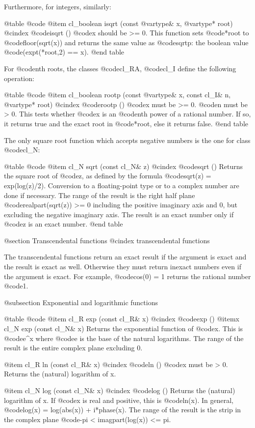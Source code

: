 Furthermore, for integers, similarly:

@table @code
@item cl_boolean isqrt (const @var{type}& x, @var{type}* root)
@cindex @code{isqrt ()}
@code{x} should be >= 0. This function sets @code{*root} to
@code{floor(sqrt(x))} and returns the same value as @code{sqrtp}:
the boolean value @code{(expt(*root,2) == x)}.
@end table

For @code{n}th roots, the classes @code{cl_RA}, @code{cl_I}
define the following operation:

@table @code
@item cl_boolean rootp (const @var{type}& x, const cl_I& n, @var{type}* root)
@cindex @code{rootp ()}
@code{x} must be >= 0. @code{n} must be > 0.
This tests whether @code{x} is an @code{n}th power of a rational number.
If so, it returns true and the exact root in @code{*root}, else it returns
false.
@end table

The only square root function which accepts negative numbers is the one
for class @code{cl_N}:

@table @code
@item cl_N sqrt (const cl_N& z)
@cindex @code{sqrt ()}
Returns the square root of @code{z}, as defined by the formula
@code{sqrt(z) = exp(log(z)/2)}. Conversion to a floating-point type
or to a complex number are done if necessary. The range of the result is the
right half plane @code{realpart(sqrt(z)) >= 0}
including the positive imaginary axis and 0, but excluding
the negative imaginary axis.
The result is an exact number only if @code{z} is an exact number.
@end table


@section Transcendental functions
@cindex transcendental functions

The transcendental functions return an exact result if the argument
is exact and the result is exact as well. Otherwise they must return
inexact numbers even if the argument is exact.
For example, @code{cos(0) = 1} returns the rational number @code{1}.


@subsection Exponential and logarithmic functions

@table @code
@item cl_R exp (const cl_R& x)
@cindex @code{exp ()}
@itemx cl_N exp (const cl_N& x)
Returns the exponential function of @code{x}. This is @code{e^x} where
@code{e} is the base of the natural logarithms. The range of the result
is the entire complex plane excluding 0.

@item cl_R ln (const cl_R& x)
@cindex @code{ln ()}
@code{x} must be > 0. Returns the (natural) logarithm of x.

@item cl_N log (const cl_N& x)
@cindex @code{log ()}
Returns the (natural) logarithm of x. If @code{x} is real and positive,
this is @code{ln(x)}. In general, @code{log(x) = log(abs(x)) + i*phase(x)}.
The range of the result is the strip in the complex plane
@code{-pi < imagpart(log(x)) <= pi}.

